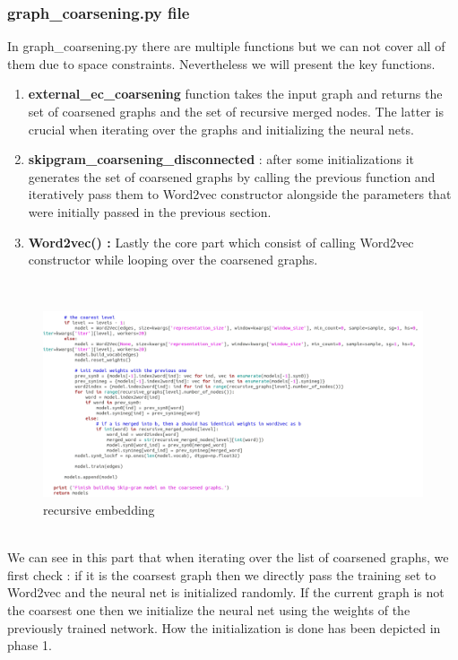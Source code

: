 \documentclass[a4paper,13pt]{article}
\begin{document}
\subsubsection{graph\_coarsening.py file}
In graph\_coarsening.py there are multiple functions but we can not cover all of them due to space constraints. Nevertheless we will present the key functions.
\begin{enumerate}
\item \textbf {external\_ec\_coarsening} function takes the input graph and returns the set of coarsened graphs and the set of recursive merged nodes. The latter is crucial when iterating  over the graphs and initializing the neural nets.

\item \textbf {skipgram\_coarsening\_disconnected} : after some initializations it generates the set of coarsened graphs by calling the previous function and iteratively pass them to Word2vec constructor alongside the parameters that were initially passed in the previous section.

\item \textbf{Word2vec() :} Lastly the core part which consist of calling Word2vec constructor while looping over the coarsened graphs.
\end{enumerate}
\\
\begin{figure}[h!]
    \centering
    \includegraphics[width=\textwidth]{screen-shots/image2.png}
    \caption{recursive embedding}
    \label{fig:my_label}
\end{figure}
\FloatBarrier
\\
We can see in this part that when iterating over the list of coarsened graphs, we first check : if it is the coarsest graph then we directly pass the training set to Word2vec and the neural net is initialized randomly. If the current graph is not the coarsest one then we initialize the neural net using the weights of the previously trained network. How the initialization is done has been depicted in phase 1.
\end{document}
